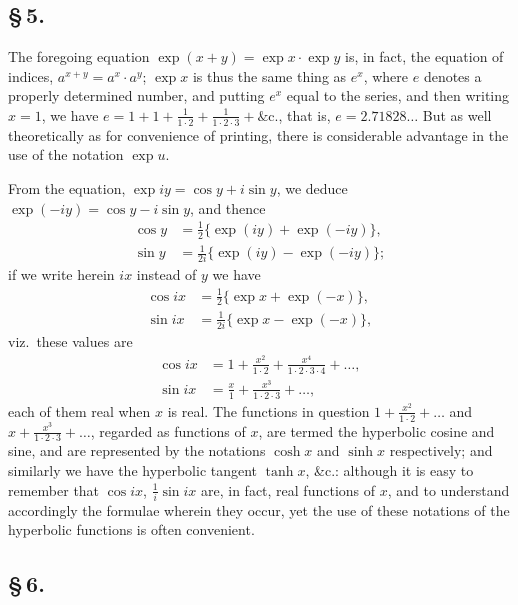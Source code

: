 \documentclass[11pt,a4paper]{article}
\begin{document}
\subsection*{\S\,5.}

The foregoing equation $\exp(x + y) = \exp x \cdot \exp y$ is, in fact, the equation of indices, $a^{x+y} = a^{x} \cdot a^{y}$; $\exp x$ is thus the same thing as $e^{x}$, where $e$ denotes a properly determined number, and putting $e^{x}$ equal to the series, and then writing $x = 1$, we have $e = 1 + 1 + \frac{1}{1 \cdot 2} + \frac{1}{1 \cdot 2 \cdot 3} + \&$c., that is, $e = 2.71828\ldots$ But as well theoretically as for convenience of printing, there is considerable advantage in the use of the notation $\exp u$.

From the equation, $\exp iy = \cos y + i\sin y$, we deduce $\exp(-iy) = \cos y - i\sin y$, and thence
\begin{align*}
\cos y &= \tfrac{1}{2}\{\exp(iy) + \exp(-iy)\}, \\
\sin y &= \tfrac{1}{2i}\{\exp(iy) - \exp(-iy)\};
\end{align*}
if we write herein $ix$ instead of $y$ we have
\begin{align*}
\cos ix &= \tfrac{1}{2}\{\exp x + \exp(-x)\}, \\
\sin ix &= \tfrac{1}{2i}\{\exp x - \exp(-x)\},
\end{align*}
viz.\ these values are
\begin{align*}
\cos ix &= 1 + \frac{x^{2}}{1 \cdot 2} + \frac{x^{4}}{1 \cdot 2 \cdot 3 \cdot 4} + \ldots, \\
\sin ix &= \frac{x}{1} + \frac{x^{3}}{1 \cdot 2 \cdot 3} + \ldots,
\end{align*}
each of them real when $x$ is real. The functions in question $1 + \frac{x^{2}}{1 \cdot 2} + \ldots$ and $x + \frac{x^{3}}{1 \cdot 2 \cdot 3} + \ldots$, regarded as functions of $x$, are termed the hyperbolic cosine and sine, and are represented by the notations $\cosh x$ and $\sinh x$ respectively; and similarly we have the hyperbolic tangent $\tanh x$, \&c.: although it is easy to remember that $\cos ix$, $\frac{1}{i}\sin ix$ are, in fact, real functions of $x$, and to understand accordingly the formulae wherein they occur, yet the use of these notations of the hyperbolic functions is often convenient.

\subsection*{\S\,6.}
\end{document}
